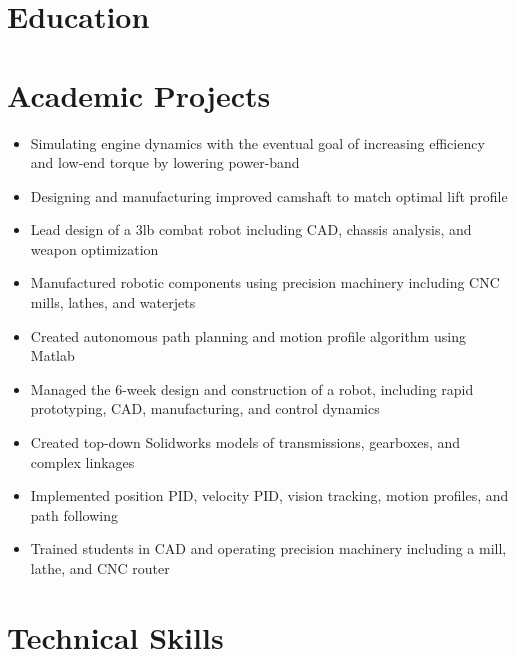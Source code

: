 \documentclass{resume}
\begin{document}
\section{Education}\section{Academic Projects}\begin{itemize}
\item Simulating engine dynamics with the eventual goal of increasing efficiency and low-end torque by lowering power-band
\item Designing and manufacturing improved camshaft to match optimal lift profile\end{itemize}\begin{itemize}
\item Lead design of a 3lb combat robot including CAD, chassis analysis, and weapon optimization
\item Manufactured robotic components using precision machinery including CNC mills, lathes, and waterjets
\item Created autonomous path planning and motion profile algorithm using Matlab\end{itemize}\begin{itemize}
\item Managed the 6-week design and construction of a robot, including rapid prototyping, CAD, manufacturing, and control dynamics
\item Created top-down Solidworks models of transmissions, gearboxes, and complex linkages
\item Implemented position PID, velocity PID, vision tracking, motion profiles, and path following
\item Trained students in CAD and operating precision machinery including a mill, lathe, and CNC router\end{itemize}\section{Technical Skills}
\end{document}
